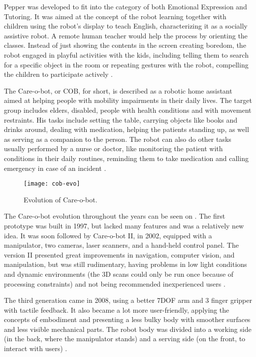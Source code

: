Pepper was developed to fit into the category of both Emotional Expression and Tutoring. It was aimed at the concept of the robot learning together with children using the robot's display to teach English, characterizing it as a socially assistive robot. A remote human teacher would help the process by orienting the classes. Instead of just showing the contents in the screen creating boredom, the robot engaged in playful activities with the kids, including telling them to search for a specific object in the room or repeating gestures with the robot, compelling the children to participate actively \cite{tanaka2015pepper}.

The Care-o-bot, or COB, for short, is described as a robotic home assistant aimed at helping people with mobility impairments in their daily lives. The target group includes elders, disabled, people with health conditions and with movement restraints. His tasks include setting the table, carrying objects like books and drinks around, dealing with medication, helping the patients standing up, as well as serving as a companion to the person. The robot can also do other tasks usually performed by a nurse or doctor, like monitoring the patient with conditions in their daily routines, reminding them to take medication and calling emergency in case of an incident \cite{graf2004care}.

\begin{figure}[!ht]
    \centering
    \texttt{[image: cob-evo]}
    \caption{Evolution of Care-o-bot.}
    \label{fig:cob-evo}
\end{figure}

The Care-o-bot evolution throughout the years can be seen on . The first prototype was built in 1997, but lacked many features and was a relatively new idea. It was soon followed by Care-o-bot II, in 2002, equipped with a manipulator, two cameras, laser scanners, and a hand-held control panel. The version II presented great improvements in navigation, computer vision, and manipulation, but was still rudimentary, having problems in low light conditions and dynamic environments (the 3D scans could only be run once because of processing constraints) and not being recommended inexperienced users \cite{graf2004care}.

The third generation came in 2008, using a better 7DOF arm and 3 finger gripper with tactile feedback. It also became a lot more user-friendly, applying the concepts of embodiment and presenting a less bulky body with smoother surfaces and less visible mechanical parts. The robot body was divided into a working side (in the back, where the manipulator stands) and a serving side (on the front, to interact with users) \cite{graf2009robotic}.

